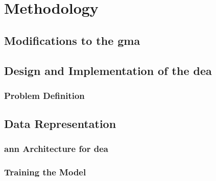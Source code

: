 \chapter{Methodology}  \label{sec:method}

\section{Modifications to the \ac{gma}} \label{sec:modifications}

\section{Design and Implementation of the \ac{dea}} \label{sec:designandimplementation}

\subsection{Problem Definition} \label{sec:problemdefinition}

\section{Data Representation} \label{sec:representation}

\subsection{\ac{ann} Architecture for \ac{dea}} \label{sec:architecture}

\subsection{Training the Model} \label{sec:training}
